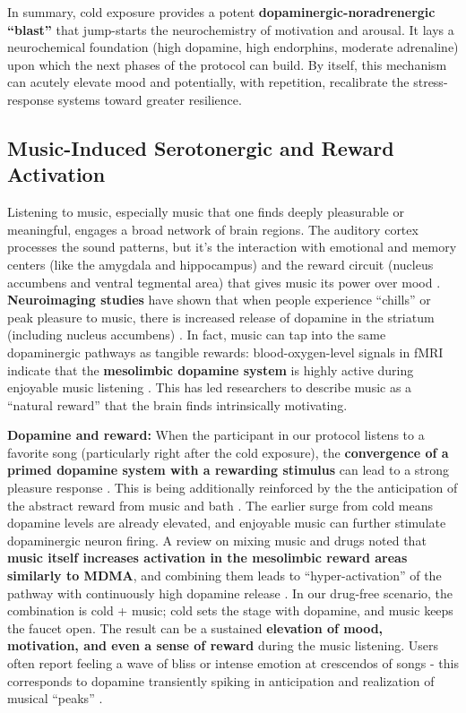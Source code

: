 \documentclass[11pt]{article}
\newcommand{\quotes}[1]{``#1''}
\begin{document}
In summary, cold exposure provides a potent \textbf{dopaminergic-noradrenergic \quotes{blast}} that jump-starts the neurochemistry of motivation and arousal. It lays a neurochemical foundation (high dopamine, high endorphins, moderate adrenaline) upon which the next phases of the protocol can build. By itself, this mechanism can acutely elevate mood and potentially, with repetition, recalibrate the stress-response systems toward greater resilience.

\subsection{Music-Induced Serotonergic and Reward Activation}
Listening to music, especially music that one finds deeply pleasurable or meaningful, engages a broad network of brain regions. The auditory cortex processes the sound patterns, but it's the interaction with emotional and memory centers (like the amygdala and hippocampus) and the reward circuit (nucleus accumbens and ventral tegmental area) that gives music its power over mood \cite{anneblood}. \textbf{Neuroimaging studies} have shown that when people experience \quotes{chills} or peak pleasure to music, there is increased release of dopamine in the striatum (including nucleus accumbens) \cite{benjamin}. In fact, music can tap into the same dopaminergic pathways as tangible rewards: blood-oxygen-level signals in fMRI indicate that the \textbf{mesolimbic dopamine system} is highly active during enjoyable music listening \cite{Feduccia2008}. This has led researchers to describe music as a \quotes{natural reward} that the brain finds intrinsically motivating.

\textbf{Dopamine and reward:} When the participant in our protocol listens to a favorite song (particularly right after the cold exposure), the \textbf{convergence of a primed dopamine system with a rewarding stimulus} can lead to a strong pleasure response \cite{anneblood}. This is being additionally reinforced by the the anticipation of the abstract reward from music and bath \cite{Salimpoor2011}. The earlier surge from cold means dopamine levels are already elevated, and enjoyable music can further stimulate dopaminergic neuron firing. A review on mixing music and drugs noted that \textbf{music itself increases activation in the mesolimbic reward areas similarly to MDMA}, and combining them leads to \quotes{hyper-activation} of the pathway with continuously high dopamine release \cite{jyiSeekingHappiness}. In our drug-free scenario, the combination is cold + music; cold sets the stage with dopamine, and music keeps the faucet open. The result can be a sustained \textbf{elevation of mood, motivation, and even a sense of reward} during the music listening. Users often report feeling a wave of bliss or intense emotion at crescendos of songs - this corresponds to dopamine transiently spiking in anticipation and realization of musical \quotes{peaks} \cite{alameda2022}.
\end{document}
